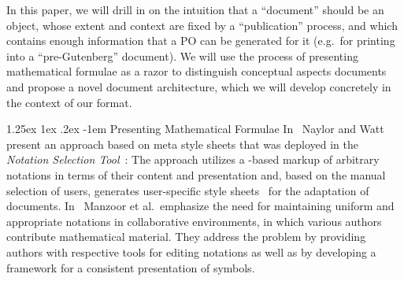 \documentclass[pdftex,bibtotocnumbered,idxtotoc,11pt]{scrartcl}
\makeatletter
\renewcommand\paragraph{\@startsection{paragraph}{4}{\z@}%
{1.25ex \@plus1ex \@minus.2ex}%
{-1em}%
{\setlength{\parfillskip}{\z@ \@plus 1fil}%
\raggedsection\normalfont\sectfont\nobreak
\size@paragraph\nobreak}}
\makeatother
\begin{document}
In this paper, we will drill in on the intuition that a ``document'' should be an object,
whose extent and context are fixed by a ``publication'' process, and which contains enough
information that a PO can be generated for it (e.g.\ for printing into a ``pre-Gutenberg''
document). We will use the process of presenting mathematical formulae as a razor to
distinguish conceptual aspects documents and propose a novel document architecture, which
we will develop concretely in the context of our {\omdoc} format.


\paragraph{Presenting Mathematical Formulae} In~\cite{Naylor:conversion} Naylor and Watt
present an approach based on meta style sheets that was deployed in the \emph{Notation
  Selection Tool}~\cite{NotSelectTool:web}: The approach utilizes a {\mathml}-based markup
of arbitrary notations in terms of their content and presentation and, based on the manual
selection of users, generates user-specific {\xslt} style sheets~\cite{W3C:xslt2} for the
adaptation of documents. In~\cite{ManLib:apo05} Manzoor et al.\ emphasize the need for
maintaining uniform and appropriate notations in collaborative environments, in which
various authors contribute mathematical material. They address the problem by providing
authors with respective tools for editing notations as well as by developing a framework
for a consistent presentation of symbols.
\end{document}
